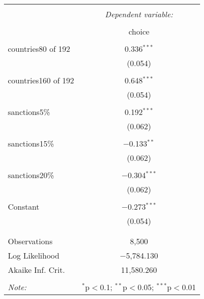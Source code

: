 \documentclass[12pt,letterpaper]{article}
\begin{document}
\begin{enumerate}
 \begin{table}[!htbp] \centering
 	\resizebox{0.45\textwidth}{!} {%
 	\begin{tabular}{@{\extracolsep{5pt}}lc} 
 		\\[-1.8ex]\hline 
 		\hline \\[-1.8ex] 
 		& \multicolumn{1}{c}{\textit{Dependent variable:}} \\ 
 		\cline{2-2} 
 		\\[-1.8ex] & choice \\ 
 		\hline \\[-1.8ex] 
 		countries80 of 192 & 0.336$^{***}$ \\ 
 		& (0.054) \\ 
 		& \\ 
 		countries160 of 192 & 0.648$^{***}$ \\ 
 		& (0.054) \\ 
 		& \\ 
 		sanctions5\% & 0.192$^{***}$ \\ 
 		& (0.062) \\ 
 		& \\ 
 		sanctions15\% & $-$0.133$^{**}$ \\ 
 		& (0.062) \\ 
 		& \\ 
 		sanctions20\% & $-$0.304$^{***}$ \\ 
 		& (0.062) \\ 
 		& \\ 
 		Constant & $-$0.273$^{***}$ \\ 
 		& (0.054) \\ 
 		& \\ 
 		\hline \\[-1.8ex] 
 		Observations & 8,500 \\ 
 		Log Likelihood & $-$5,784.130 \\ 
 		Akaike Inf. Crit. & 11,580.260 \\ 
 		\hline 
 		\hline \\[-1.8ex] 
 		\textit{Note:}  & \multicolumn{1}{r}{$^{*}$p$<$0.1; $^{**}$p$<$0.05; $^{***}$p$<$0.01} \\ 
 	\end{tabular} }
 \caption{} 
 \label{}
 \end{table}
	
	\newpage
		

\end{enumerate}
\end{document}
